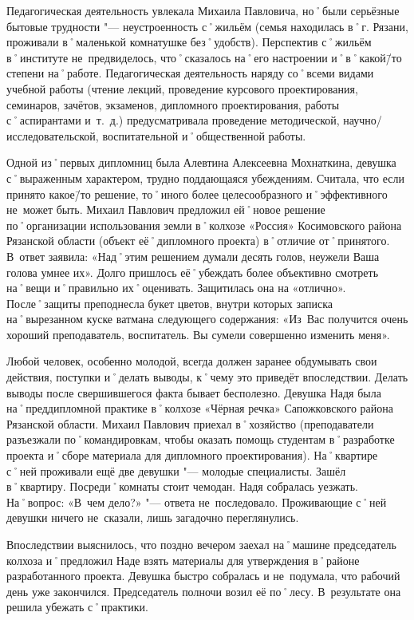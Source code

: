 Педагогическая деятельность увлекала Михаила Павловича, но˚были серьёзные бытовые трудности "--- неустроенность с˚жильём (семья находилась в˚г. Рязани, проживали в˚маленькой комнатушке без˚удобств). Перспектив с˚жильём в˚институте не~предвиделось, что˚сказалось на˚его настроении и˚в˚какой\=/то степени на˚работе.
Педагогическая деятельность наряду со˚всеми видами учебной работы (чтение лекций, проведение курсового проектирования, семинаров, зачётов, экзаменов, дипломного проектирования, работы с˚аспирантами и~т.~д.) предусматривала проведение методической, научно\-/исследовательской, воспитательной и˚общественной работы.

Одной из˚первых дипломниц была Алевтина Алексеевна Мохнаткина, девушка с˚выраженным характером, трудно поддающаяся убеждениям. Считала, что если принято какое\=/то решение, то˚иного более целесообразного и˚эффективного не~может быть. Михаил Павлович предложил ей˚новое решение по˚организации использования земли в˚колхозе «Россия» Косимовского района Рязанской области (объект её˚дипломного проекта) в˚отличие от˚принятого. В~ответ заявила: «Над˚этим решением думали десять голов, неужели Ваша голова умнее их». Долго пришлось её˚убеждать более объективно смотреть на˚вещи и˚правильно их˚оценивать. Защитилась она на «отлично». После˚защиты преподнесла букет цветов, внутри которых записка на˚вырезанном куске ватмана следующего содержания: «Из~Вас получится очень хороший преподаватель, воспитатель. Вы сумели совершенно изменить меня».

Любой человек, особенно молодой, всегда должен заранее обдумывать свои действия, поступки и˚делать выводы, к˚чему это приведёт впоследствии. Делать выводы после свершившегося факта бывает бесполезно. Девушка Надя была на˚преддипломной практике в˚колхозе «Чёрная речка» Сапожковского района Рязанской области. Михаил Павлович приехал в˚хозяйство (преподаватели разъезжали по˚командировкам, чтобы оказать помощь студентам в˚разработке проекта и˚сборе материала для дипломного проектирования). На˚квартире с˚ней проживали ещё две девушки "--- молодые специалисты. Зашёл в˚квартиру. Посреди˚комнаты стоит чемодан. Надя собралась уезжать. На˚вопрос: «В~чем дело?» "--- ответа не~последовало. Проживающие с˚ней девушки ничего не~сказали, лишь загадочно переглянулись. 

Впоследствии выяснилось, что поздно вечером заехал на˚машине председатель колхоза и˚предложил Наде взять материалы для утверждения в˚районе разработанного проекта. Девушка быстро собралась и не~подумала, что рабочий день уже закончился. Председатель полночи возил её по˚лесу. В~результате она решила убежать с˚практики. 

